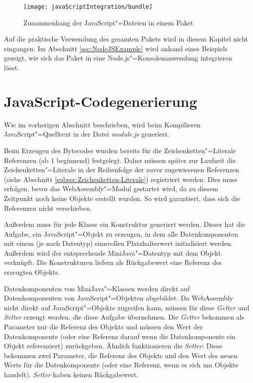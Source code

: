 \begin{figure}[]
    \centering
    \texttt{[image: javaScriptIntegration/bundle]}
    \caption{Zusammenhang der JavaScript"=Dateien in einem Paket}
    \label{fig:bundleStructure}
\end{figure}

Auf die praktische Verwendung des gesamten Pakets wird in diesem Kapitel nicht eingangen. Im Abschnitt \ref{sec:NodeJSExample} wird anhand eines Beispiels gezeigt, wie sich das Paket in eine Node.js"=Konsolenanwendung integrieren lässt.

\section{JavaScript-Codegenerierung}
\label{sec:JavaScript-Codegenerierung}

Wie im vorherigen Abschnitt beschrieben, wird beim Kompilieren JavaScript"=Quelltext in der Datei \emph{module.js} generiert.

Beim Erzeugen des Bytecodes wurden bereits für die Zeichenketten"=Literale Referenzen (ab 1 beginnend) festgelegt. Daher müssen später zur Laufzeit die Zeichenketten"=Literale in der Reihenfolge der zuvor zugewiesenen Referenzen (siehe Abschnitt \ref{subsec:Zeichenketten-Literale}) registriert werden. Dies muss erfolgen, bevor das WebAssembly"=Modul gestartet wird, da zu diesem Zeitpunkt noch keine Objekte erstellt wurden. So wird garantiert, dass sich die Referenzen nicht verschieben.

Außerdem muss für jede Klasse ein Konstruktur generiert werden. Dieser hat die Aufgabe, ein JavaScript"=Objekt zu erzeugen, in dem alle Datenkomponenten mit einem (je nach Datentyp) sinnvollen Platzhalterwert initialisiert werden. Außerdem wird der entsprechende MiniJava"=Datentyp mit dem Objekt verknüpft. Die Konstrukturen liefern als Rückgabewert eine Referenz des erzeugten Objekts.

Datenkomponenten von MiniJava"=Klassen werden direkt auf Datenkomponenten von JavaScript"=Objekten abgebildet. Da WebAssembly nicht direkt auf JavaScript"=Objekte zugreifen kann, müssen für diese \emph{Getter} und \emph{Setter} erzeugt werden, die diese Aufgabe übernehmen. Die \emph{Getter} bekommen als Parameter nur die Referenz des Objekts und müssen den Wert der Datenkomponente (oder eine Referenz darauf wenn die Datenkomponente ein Objekt referenziert) zurückgeben. Ähnlich funktionieren die \emph{Setter}: Diese bekommen zwei Parameter, die Referenz des Objekts und den Wert des neuen Werts für die Datenkomponente (oder eine Referenz, wenn es sich um Objekte handelt). \emph{Setter} haben keinen Rückgabewert.

